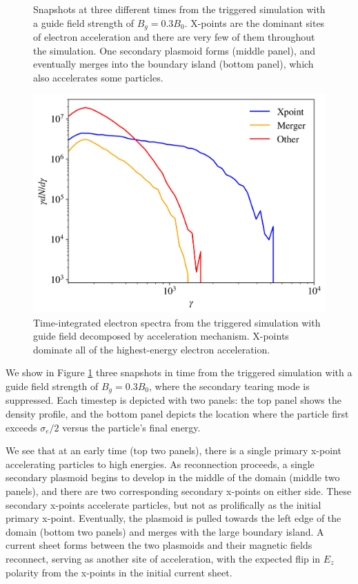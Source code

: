 \documentclass[iop,twocolappendix]{emulateapj}
\begin{document}
\begin{figure}[htp]
	\caption{Snapshots at three different times from the triggered simulation with a guide field strength of $B_{g}=0.3B_{0}$.  X-points are the dominant sites of electron acceleration and there are very few of them throughout the simulation.  One secondary plasmoid forms (middle panel), and eventually merges into the boundary island (bottom panel), which also accelerates some particles.
	}
	\label{triggered_bguide_snapshots}
\end{figure}


\begin{figure}[htp]
	
	\includegraphics[width=\linewidth]{8k_bguide_triggered_stride1_2thresh_accmec_spect.png}
	\caption{Time-integrated electron spectra from the triggered simulation with guide field decomposed by acceleration mechanism.  X-points dominate all of the highest-energy electron acceleration.}
	\label{triggered_bguide_spec}
\end{figure}


We show in Figure \ref{triggered_bguide_snapshots} three snapshots in time from the triggered simulation with a guide field strength of $B_{g}=0.3B_{0}$, where the secondary tearing mode is suppressed.  Each timestep is depicted with two panels: the top panel shows the density profile, and the bottom panel depicts the location where the particle first exceeds $\sigma_{e}/2$ versus the particle's final energy. 

We see that at an early time (top two panels), there is a single primary x-point accelerating particles to high energies.  As reconnection proceeds, a single secondary plasmoid begins to develop in the middle of the domain (middle two panels), and there are two corresponding secondary x-points on either side.  These secondary x-points accelerate particles, but not as prolifically as the initial primary x-point.  Eventually, the plasmoid is pulled towards the left edge of the domain (bottom two panels) and merges with the large boundary island.  A current sheet forms between the two plasmoids and their magnetic fields reconnect, serving as another site of acceleration, with the expected flip in $E_{z}$ polarity from the x-points in the initial current sheet.  
\end{document}
